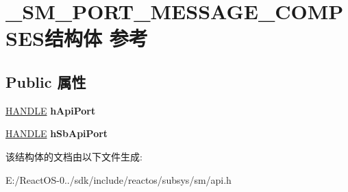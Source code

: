 \hypertarget{struct___s_m___p_o_r_t___m_e_s_s_a_g_e___c_o_m_p_s_e_s}{}\section{\+\_\+\+S\+M\+\_\+\+P\+O\+R\+T\+\_\+\+M\+E\+S\+S\+A\+G\+E\+\_\+\+C\+O\+M\+P\+S\+E\+S结构体 参考}
\label{struct___s_m___p_o_r_t___m_e_s_s_a_g_e___c_o_m_p_s_e_s}
\subsection*{Public 属性}
\begin{DoxyCompactItemize}
\item 
\mbox{\label{struct___s_m___p_o_r_t___m_e_s_s_a_g_e___c_o_m_p_s_e_s_a9c5204b9f803714c8dc25d9178759d4f}} 
\hyperlink{interfacevoid}{H\+A\+N\+D\+LE} {\bfseries h\+Api\+Port}
\item 
\mbox{\label{struct___s_m___p_o_r_t___m_e_s_s_a_g_e___c_o_m_p_s_e_s_a76ed1d511e9b9ee38033d2f61bb0efc0}} 
\hyperlink{interfacevoid}{H\+A\+N\+D\+LE} {\bfseries h\+Sb\+Api\+Port}
\end{DoxyCompactItemize}


该结构体的文档由以下文件生成\+:\begin{DoxyCompactItemize}
\item 
E\+:/\+React\+O\+S-\/0../sdk/include/reactos/subsys/sm/api.\+h\end{DoxyCompactItemize}
